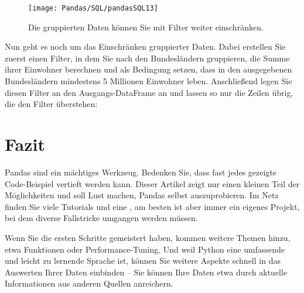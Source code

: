 \begin{figure}
	\texttt{[image: Pandas/SQL/pandasSQL13]}
	\caption{Die gruppierten Daten können Sie mit Filter weiter einschränken.}
\end{figure}

Nun geht es noch um das Einschränken gruppierter Daten. Dabei erstellen Sie zuerst einen Filter, in dem Sie nach den Bundesländern gruppieren, die Summe ihrer Einwohner berechnen und als Bedingung setzen, dass in den ausgegebenen Bundesländern mindestens 5 Millionen Einwohner leben. Anschließend legen Sie diesen Filter an den Ausgangs-DataFrame an und lassen so nur die Zeilen übrig, die den Filter überstehen:

\medskip







\section{Fazit}
Pandas sind ein mächtiges Werkzeug. Bedenken Sie, dass fast jedes gezeigte Code-Beispiel vertieft werden kann. Dieser Artikel zeigt nur einen kleinen Teil der Möglichkeiten und soll Lust machen, Pandas selbst auszuprobieren. Im Netz finden Sie viele Tutorials und eine , am besten ist aber immer ein eigenes Projekt, bei dem diverse Fallstricke umgangen werden müssen.

Wenn Sie die ersten Schritte gemeistert haben, kommen weitere Themen hinzu, etwa Funktionen oder Performance-Tuning. Und weil Python eine umfassende und leicht zu lernende Sprache ist, können Sie weitere Aspekte schnell in das Auswerten Ihrer Daten einbinden – Sie können Ihre Daten etwa durch aktuelle Informationen aus anderen Quellen anreichern.

